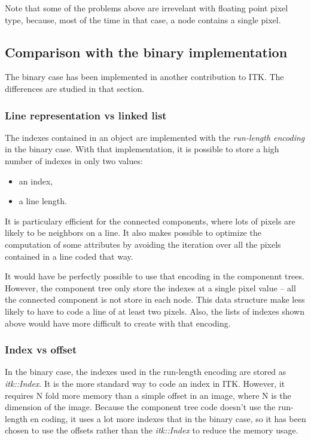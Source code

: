 \documentclass{InsightArticle}
\begin{document}
Note that some of the problems above are irrevelant with floating point pixel type, because, most of the time in that case, a node contains a single pixel.

  \subsection{Comparison with the binary implementation}

The binary case has been implemented in another contribution to ITK. The differences are studied in that section.

    \subsubsection{Line representation vs linked list}

The indexes contained in an object are implemented with the {\em run-length encoding} in the binary case. With that implementation, it is possible to store a high number of indexes in only two values:
\begin{itemize}
  \item an index,
  \item a line length.
\end{itemize}
It is particulary efficient for the connected components, where lots of pixels are likely to be neighbors on a line. It also makes possible to optimize the computation of some attributes by avoiding the iteration over all the pixels contained in a line coded that way.

It would have be perfectly possible to use that encoding in the componennt trees. However, the component tree only store the indexes at a single pixel value -- all the connected component is not store in each node. This data structure make less likely to have to code a line of at least two pixels. Also, the lists of indexes shown above would have more difficult to create with that encoding.

    \subsubsection{Index vs offset}

In the binary case, the indexes used in the run-length encoding are stored as {\em itk::Index}. It is the more standard way to code an index in ITK. However, it requires N fold more memory than a simple offset in an image, where N is the dimension of the image. Because the component tree code doesn't use the run-length en coding, it uses a lot more indexes that in the binary case, so it has been chosen to use the offsets rather than the {\em itk::Index} to reduce the memory usage.
\end{document}
